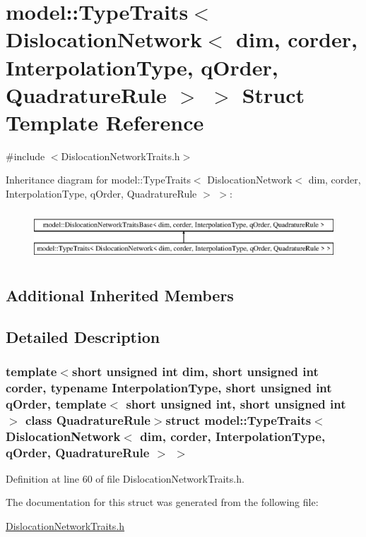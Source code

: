 \hypertarget{structmodel_1_1_type_traits_3_01_dislocation_network_3_01dim_00_01corder_00_01_interpolation_typb44c9a0829b0ec93825ce805eb39aeed}{}\section{model\+:\+:Type\+Traits$<$ Dislocation\+Network$<$ dim, corder, Interpolation\+Type, q\+Order, Quadrature\+Rule $>$ $>$ Struct Template Reference}
\label{structmodel_1_1_type_traits_3_01_dislocation_network_3_01dim_00_01corder_00_01_interpolation_typb44c9a0829b0ec93825ce805eb39aeed}


{\ttfamily \#include $<$Dislocation\+Network\+Traits.\+h$>$}

Inheritance diagram for model\+:\+:Type\+Traits$<$ Dislocation\+Network$<$ dim, corder, Interpolation\+Type, q\+Order, Quadrature\+Rule $>$ $>$\+:\begin{figure}[H]
\begin{center}
\leavevmode
\includegraphics[height=1.885522cm]{structmodel_1_1_type_traits_3_01_dislocation_network_3_01dim_00_01corder_00_01_interpolation_typb44c9a0829b0ec93825ce805eb39aeed}
\end{center}
\end{figure}
\subsection*{Additional Inherited Members}


\subsection{Detailed Description}
\subsubsection*{template$<$short unsigned int dim, short unsigned int corder, typename Interpolation\+Type, short unsigned int q\+Order, template$<$ short unsigned int, short unsigned int $>$ class Quadrature\+Rule$>$struct model\+::\+Type\+Traits$<$ Dislocation\+Network$<$ dim, corder, Interpolation\+Type, q\+Order, Quadrature\+Rule $>$ $>$}



Definition at line 60 of file Dislocation\+Network\+Traits.\+h.



The documentation for this struct was generated from the following file\+:\begin{DoxyCompactItemize}
\item 
\hyperlink{_dislocation_network_traits_8h}{Dislocation\+Network\+Traits.\+h}\end{DoxyCompactItemize}
